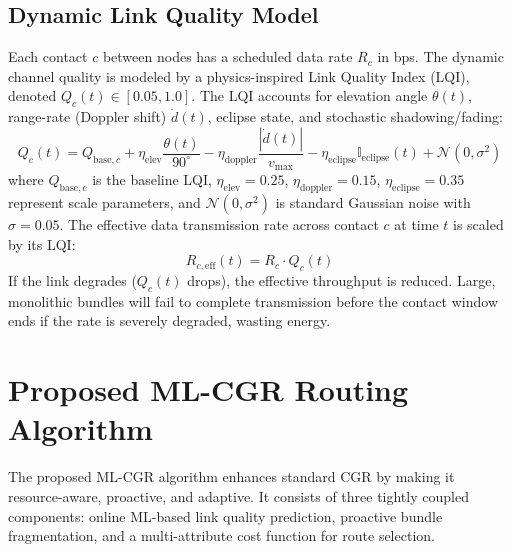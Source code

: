 \documentclass[a4paper,fleqn]{cas-dc}
\newcommand{\mlcgr}{\textsf{ML-CGR}}
\begin{document}
\subsection{Dynamic Link Quality Model}
Each contact $c$ between nodes has a scheduled data rate $R_c$ in bps. The dynamic channel quality is modeled by a physics-inspired Link Quality Index (LQI), denoted $Q_c(t) \in [0.05, 1.0]$. The LQI accounts for elevation angle $\theta(t)$, range-rate (Doppler shift) $\dot{d}(t)$, eclipse state, and stochastic shadowing/fading:
\begin{equation}
    Q_c(t) = Q_{\text{base},c} + \eta_{\text{elev}} \frac{\theta(t)}{90^\circ} - \eta_{\text{doppler}} \frac{|\dot{d}(t)|}{v_{\text{max}}} - \eta_{\text{eclipse}} \mathbb{I}_{\text{eclipse}}(t) + \mathcal{N}(0, \sigma^2)
\end{equation}
where $Q_{\text{base},c}$ is the baseline LQI, $\eta_{\text{elev}} = 0.25$, $\eta_{\text{doppler}} = 0.15$, $\eta_{\text{eclipse}} = 0.35$ represent scale parameters, and $\mathcal{N}(0, \sigma^2)$ is standard Gaussian noise with $\sigma = 0.05$. The effective data transmission rate across contact $c$ at time $t$ is scaled by its LQI:
\begin{equation}
    R_{c,\text{eff}}(t) = R_c \cdot Q_c(t)
\end{equation}
If the link degrades ($Q_c(t)$ drops), the effective throughput is reduced. Large, monolithic bundles will fail to complete transmission before the contact window ends if the rate is severely degraded, wasting energy.

\section{Proposed ML-CGR Routing Algorithm}
\label{sec:mlcgr}

The proposed \mlcgr{} algorithm enhances standard CGR by making it resource-aware, proactive, and adaptive. It consists of three tightly coupled components: online ML-based link quality prediction, proactive bundle fragmentation, and a multi-attribute cost function for route selection.
\end{document}
